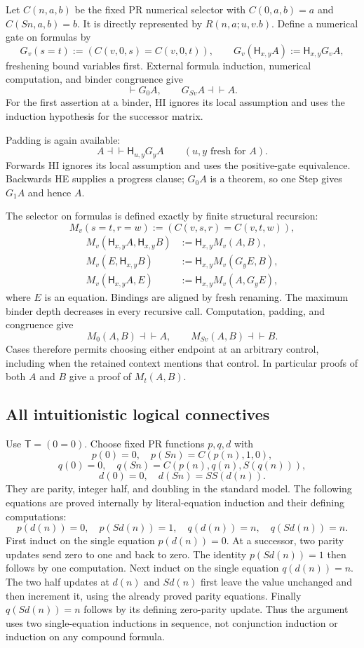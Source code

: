 \documentclass[11pt,letterpaper]{article}
\theoremstyle{definition}\newtheorem{definition}[theorem]{Definition}
\theoremstyle{remark}\newtheorem{remark}[theorem]{Remark}
\begin{document}
Let $C(n,a,b)$ be the fixed PR numerical selector with
$C(0,a,b)=a$ and $C(Sn,a,b)=b$.  It is directly represented by
$R(n,a;u,v.b)$.  Define a numerical gate on formulas by
\[
 G_v(s=t):=(C(v,0,s)=C(v,0,t)),\qquad
 G_v(\mathsf H_{x,y}A):=\mathsf H_{x,y}G_vA,
\]
freshening bound variables first.  External formula induction, numerical
computation, and binder congruence give
\[
 \vdash G_0A,\qquad G_{Sv}A\dashv\vdash A.
\]
For the first assertion at a binder, HI ignores its local assumption
and uses the induction hypothesis for the successor matrix.

Padding is again available:
\[
 A\dashv\vdash \mathsf H_{u,y}G_yA
 \qquad(u,y\text{ fresh for }A).
 \tag{Padding-H}
\]
Forwards HI ignores its local assumption and uses the positive-gate
equivalence.  Backwards HE supplies a progress clause; $G_0A$ is a
theorem, so one Step gives $G_1A$ and hence $A$.

The selector on formulas is defined exactly by finite structural
recursion:
\[
 M_v(s=t,r=w):=(C(v,s,r)=C(v,t,w)),
\]
\[
\begin{aligned}
 M_v(\mathsf H_{x,y}A,\mathsf H_{x,y}B)
      &:=\mathsf H_{x,y}M_v(A,B),\\
 M_v(E,\mathsf H_{x,y}B)&:=\mathsf H_{x,y}M_v(G_yE,B),\\
 M_v(\mathsf H_{x,y}A,E)&:=\mathsf H_{x,y}M_v(A,G_yE),
\end{aligned}
\]
where $E$ is an equation.  Bindings are aligned by fresh renaming.
The maximum binder depth decreases in every recursive call.  Computation,
padding, and congruence give
\[
 M_0(A,B)\dashv\vdash A,\qquad M_{Sv}(A,B)\dashv\vdash B.
 \tag{Selector-H}
\]
Cases therefore permits choosing either endpoint at an arbitrary control,
including when the retained context mentions that control.  In particular
proofs of both $A$ and $B$ give a proof of $M_t(A,B)$.

\subsection{All intuitionistic logical connectives}

Use $\mathsf T=(0=0)$.  Choose fixed PR functions $p,q,d$ with
\[
 p(0)=0,\quad p(Sn)=C(p(n),1,0),
\]
\[
 q(0)=0,\quad q(Sn)=C(p(n),q(n),S(q(n))),
\]
\[
 d(0)=0,\quad d(Sn)=SS(d(n)).
\]
They are parity, integer half, and doubling in the standard model.
The following equations are proved internally by literal-equation
induction and their defining computations:
\[
 p(d(n))=0,\quad p(Sd(n))=1,\quad
 q(d(n))=n,\quad q(Sd(n))=n.
 \tag{Clock}
\]
First induct on the single equation $p(d(n))=0$.  At a successor,
two parity updates send zero to one and back to zero.  The identity
$p(Sd(n))=1$ then follows by one computation.  Next induct on the
single equation $q(d(n))=n$.  The two half updates at $d(n)$ and
$Sd(n)$ first leave the value unchanged and then increment it, using
the already proved parity equations.  Finally $q(Sd(n))=n$ follows
by its defining zero-parity update.  Thus the argument uses two
single-equation inductions in sequence, not conjunction induction or
induction on any compound formula.
\end{document}
